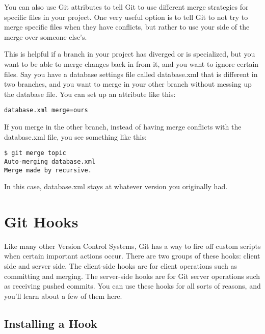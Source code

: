 \documentclass[a4paper]{book}
\newcounter{tab}[chapter]
\begin{document}
You can also use Git attributes to tell Git to use different merge strategies for specific files in your project. One very useful option is to tell Git to not try to merge specific files when they have conflicts, but rather to use your side of the merge over someone else's.

This is helpful if a branch in your project has diverged or is specialized, but you want to be able to merge changes back in from it, and you want to ignore certain files. Say you have a database settings file called database.xml that is different in two branches, and you want to merge in your other branch without messing up the database file. You can set up an attribute like this:

\begin{shaded}\begin{verbatim}
database.xml merge=ours
\end{verbatim}\end{shaded}

If you merge in the other branch, instead of having merge conflicts with the database.xml file, you see something like this:

\begin{shaded}\begin{verbatim}
$ git merge topic
Auto-merging database.xml
Merge made by recursive.
\end{verbatim}\end{shaded}

In this case, database.xml stays at whatever version you originally had.

\section{Git Hooks}\label{git-hooks}

Like many other Version Control Systems, Git has a way to fire off custom scripts when certain important actions occur. There are two groups of these hooks: client side and server side. The client-side hooks are for client operations such as committing and merging. The server-side hooks are for Git server operations such as receiving pushed commits. You can use these hooks for all sorts of reasons, and you'll learn about a few of them here.

\subsection{Installing a Hook}\label{installing-a-hook}
\end{document}
